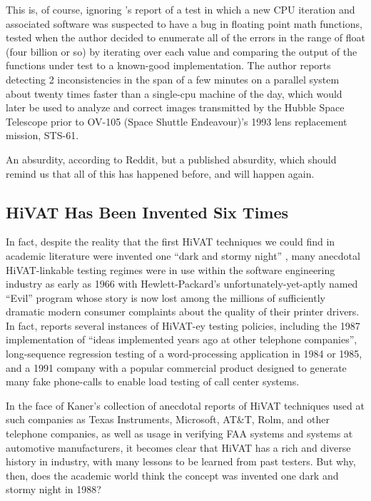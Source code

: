 This is, of course, ignoring \citet{hoffman2003Exhausting}'s report of a test in which a new CPU iteration and associated software was suspected to have a bug in floating point math functions, tested when the author decided to enumerate all of the errors in the range of float (four billion or so) by iterating over each value and comparing the output of the functions under test to a known-good implementation. The author reports detecting 2 inconsistencies in the span of a few minutes on a parallel system about twenty times faster than a single-cpu machine of the day, which would later be used to analyze and correct images transmitted by the Hubble Space Telescope prior to OV-105 (Space Shuttle Endeavour)'s 1993 lens replacement mission, STS-61.

An absurdity, according to Reddit, but a published absurdity, which should remind us that all of this has happened before, and will happen again.

\subsection{HiVAT Has Been Invented Six Times}
In fact, despite the reality that the first HiVAT techniques we could find in academic literature were invented one ``dark and stormy night'' \citep{miller1989TR830}, many anecdotal HiVAT-linkable testing regimes were in use within the software engineering industry as early as 1966 with Hewlett-Packard's unfortunately-yet-aptly named ``Evil'' program whose story is now lost among the millions of sufficiently dramatic modern consumer complaints about the quality of their printer drivers. In fact, \citet{KanerHivatOverview} reports several instances of HiVAT-ey testing policies, including the 1987 implementation of ``ideas implemented years ago at other telephone companies'', long-sequence regression testing of a word-processing application in 1984 or 1985, and a 1991 company with a popular commercial product designed to generate many fake phone-calls to enable load testing of call center systems.

In the face of Kaner's collection of anecdotal reports of HiVAT techniques used at such companies as Texas Instruments, Microsoft, AT\&T, Rolm, and other telephone companies, as well as usage in verifying FAA systems and systems at automotive manufacturers, it becomes clear that HiVAT has a rich and diverse history in industry, with many lessons to be learned from past testers. But why, then, does the academic world think the concept was invented one dark and stormy night in 1988?

